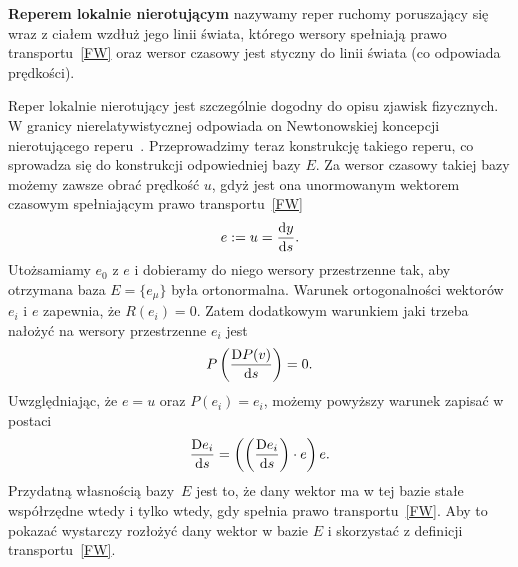 \begin{definition}
\textbf{Reperem lokalnie nierotującym} nazywamy reper ruchomy poruszający
się wraz z ciałem wzdłuż jego linii świata, którego 
wersory spełniają prawo transportu~\eqref{FW} oraz wersor czasowy 
jest styczny do linii świata (co odpowiada prędkości).
\end{definition}
Reper lokalnie nierotujący jest szczególnie dogodny do opisu zjawisk 
fizycznych. W granicy nierelatywistycznej odpowiada on Newtonowskiej 
koncepcji nierotującego reperu~\cite{synge1960}. 
Przeprowadzimy teraz
konstrukcję takiego reperu, co sprowadza się do konstrukcji 
odpowiedniej bazy $E$.
Za wersor czasowy takiej bazy możemy zawsze obrać prędkość $u$, gdyż 
jest ona unormowanym wektorem czasowym spełniającym 
prawo transportu~\eqref{FW}
\begin{align*}
e := u = \frac{\text{d} y}{\text{d} s}.
\end{align*}
Utożsamiamy $e_0$ z $e$ i dobieramy do niego wersory 
przestrzenne tak, aby otrzymana baza $E=\{ e_\mu \}$ była
 ortonormalna.  Warunek ortogonalności wektorów $e_i$ i $ e$ 
zapewnia, że $R(e_i)=0$. 
Zatem dodatkowym warunkiem jaki trzeba nałożyć na wersory
przestrzenne $e_i$ jest 
\begin{align*}
P \left(\frac{\text{D} P(v)}{\text{d} s} \right)  = 0.
\end{align*} 
Uwzględniając, że $e=u$ oraz $P(e_i)=e_i$, możemy powyższy warunek
zapisać w postaci
\begin{align}\label{FWwkw}
\frac{\text{D} e_i }{\text{d} s} = 
\left( \left(\frac{\text{D} e_i }{\text{d} s}\right) \cdot e\right) e .
\end{align}
Przydatną własnością bazy~$E$ jest to, że dany wektor 
ma w tej bazie stałe współrzędne wtedy i tylko wtedy, gdy
spełnia prawo transportu~\eqref{FW}.
Aby to pokazać wystarczy rozłożyć dany wektor w bazie 
$E$ i skorzystać z definicji transportu~\eqref{FW}.

